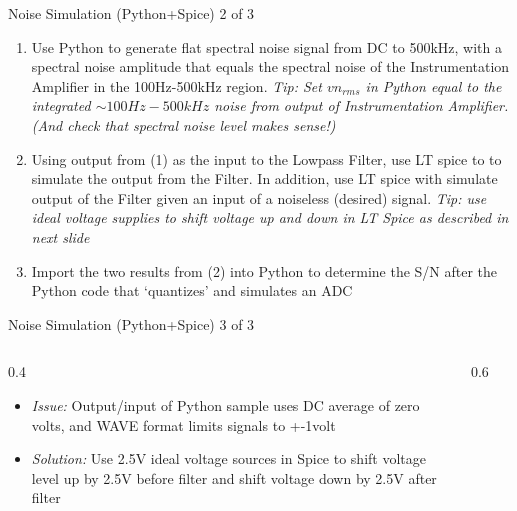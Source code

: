 \documentclass[aspectratio=169]{beamer}
\begin{document}
\begin{frame}{Noise Simulation (Python+Spice) 2 of 3}
    \begin{enumerate}
        \item Use Python to generate flat spectral noise signal from DC to 500kHz, with a spectral noise amplitude that equals the spectral noise of the Instrumentation Amplifier in the 100Hz-500kHz region. \textit{Tip: Set $vn_{rms}$ in Python equal to the integrated $\sim 100Hz-500kHz$ noise from output of Instrumentation Amplifier. (And check that spectral noise level makes sense!)}
        \vspace{0.2cm}
        \item Using output from (1) as the input to the Lowpass Filter, use LT spice to to simulate the output from the Filter. In addition, use LT spice with simulate output of the Filter given an input of a noiseless (desired) signal. \textit{Tip: use ideal voltage supplies to shift voltage up and down in LT Spice as described in next slide}
        \vspace{0.2cm}
        \item Import the two results from (2) into Python to determine the S/N after the Python code that `quantizes' and simulates an ADC
    \end{enumerate}
\end{frame}

\begin{frame}{Noise Simulation (Python+Spice) 3 of 3}
    \begin{columns}
        \begin{column}{0.4\textwidth}
            \begin{itemize}
                \item \textit{Issue:} Output/input of Python sample uses DC average of zero volts, and WAVE format limits signals to +-1volt
                \item \textit{Solution:} Use 2.5V ideal voltage sources in Spice to shift voltage level up by 2.5V before filter and shift voltage down by 2.5V after filter
            \end{itemize}
        \end{column}
        \begin{column}{0.6\textwidth}
            \begin{figure}
                \centering
            \end{figure}
        \end{column}
    \end{columns}
\end{frame}
\end{document}
